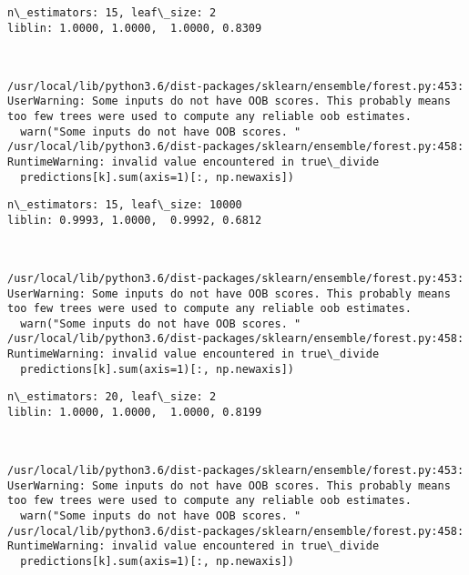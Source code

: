 \documentclass[11pt]{article}
\begin{document}
    \begin{Verbatim}[commandchars=\\\{\}]
n\_estimators: 15, leaf\_size: 2
liblin: 1.0000, 1.0000,  1.0000, 0.8309 



    \end{Verbatim}

    \begin{Verbatim}[commandchars=\\\{\}]
/usr/local/lib/python3.6/dist-packages/sklearn/ensemble/forest.py:453: UserWarning: Some inputs do not have OOB scores. This probably means too few trees were used to compute any reliable oob estimates.
  warn("Some inputs do not have OOB scores. "
/usr/local/lib/python3.6/dist-packages/sklearn/ensemble/forest.py:458: RuntimeWarning: invalid value encountered in true\_divide
  predictions[k].sum(axis=1)[:, np.newaxis])

    \end{Verbatim}

    \begin{Verbatim}[commandchars=\\\{\}]
n\_estimators: 15, leaf\_size: 10000
liblin: 0.9993, 1.0000,  0.9992, 0.6812 



    \end{Verbatim}

    \begin{Verbatim}[commandchars=\\\{\}]
/usr/local/lib/python3.6/dist-packages/sklearn/ensemble/forest.py:453: UserWarning: Some inputs do not have OOB scores. This probably means too few trees were used to compute any reliable oob estimates.
  warn("Some inputs do not have OOB scores. "
/usr/local/lib/python3.6/dist-packages/sklearn/ensemble/forest.py:458: RuntimeWarning: invalid value encountered in true\_divide
  predictions[k].sum(axis=1)[:, np.newaxis])

    \end{Verbatim}

    \begin{Verbatim}[commandchars=\\\{\}]
n\_estimators: 20, leaf\_size: 2
liblin: 1.0000, 1.0000,  1.0000, 0.8199 



    \end{Verbatim}

    \begin{Verbatim}[commandchars=\\\{\}]
/usr/local/lib/python3.6/dist-packages/sklearn/ensemble/forest.py:453: UserWarning: Some inputs do not have OOB scores. This probably means too few trees were used to compute any reliable oob estimates.
  warn("Some inputs do not have OOB scores. "
/usr/local/lib/python3.6/dist-packages/sklearn/ensemble/forest.py:458: RuntimeWarning: invalid value encountered in true\_divide
  predictions[k].sum(axis=1)[:, np.newaxis])

    \end{Verbatim}
\end{document}
